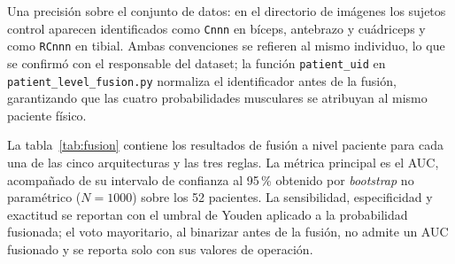 \documentclass[12pt]{extarticle}
\numberwithin{equation}{section}
\begin{document}
\begin{refsection}
Una precisión sobre el conjunto de datos: en el directorio de imágenes los sujetos control aparecen identificados como \texttt{Cnnn} en bíceps, antebrazo y cuádriceps y como \texttt{RCnnn} en tibial. Ambas convenciones se refieren al mismo individuo, lo que se confirmó con el responsable del dataset; la función \texttt{patient\_uid} en \texttt{patient\_\allowbreak level\_\allowbreak fusion.py} normaliza el identificador antes de la fusión, garantizando que las cuatro probabilidades musculares se atribuyan al mismo paciente físico.

La tabla~\ref{tab:fusion} contiene los resultados de fusión a nivel paciente para cada una de las cinco arquitecturas y las tres reglas. La métrica principal es el AUC, acompañado de su intervalo de confianza al 95\,\% obtenido por \textit{bootstrap} no paramétrico ($N=1000$) sobre los 52 pacientes. La sensibilidad, especificidad y exactitud se reportan con el umbral de Youden aplicado a la probabilidad fusionada; el voto mayoritario, al binarizar antes de la fusión, no admite un AUC fusionado y se reporta solo con sus valores de operación.


\end{refsection}
\end{document}

